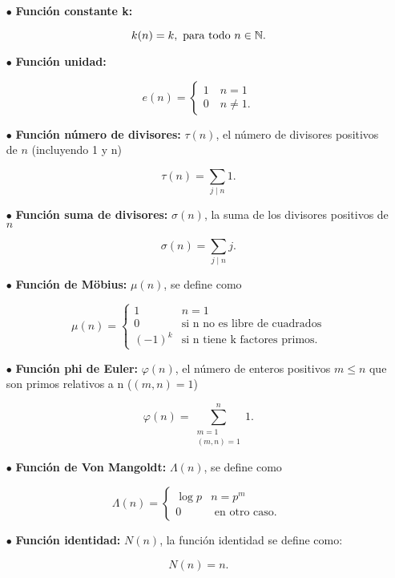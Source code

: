 \begin{itemize}
\item[$\bullet$] \textbf{Función constante k:}

$$k(n)=k, \text{ para todo } n \in \mathbb{N}. $$

\item[$\bullet$] \textbf{Función unidad:}

$$e(n)=\begin{cases}
1 \quad n=1\\
0 \quad n\neq 1.
\end{cases}$$

\item[$\bullet$] \textbf{Función número de divisores:} $\tau(n)$, el número de divisores positivos de $n$ (incluyendo 1 y n)

$$\tau(n)=\sum_{j\mid n}1.$$

\item[$\bullet$] \textbf{Función suma de divisores:} $\sigma(n)$, la suma de los divisores positivos de $n$

$$\sigma(n)=\sum_{j\mid n}j.$$

\item[$\bullet$] \textbf{Función de Möbius:} $\mu(n)$, se define como

$$\mu(n)=\begin{cases}
1  &n=1\\
0  &\text{si n no es libre de cuadrados}\\
(-1)^k &\text{si n tiene k factores primos.}
\end{cases}$$

\item[$\bullet$] \textbf{Función phi de Euler:} $\varphi(n)$, el número de enteros positivos $m\leq n$ que son primos relativos a n ($(m,n)=1$)

$$\varphi(n)=\sum_{\substack{m=1 \\(m, n)=1}}^n 1.$$

\item[$\bullet$]\textbf{Función de Von Mangoldt:} $\Lambda(n)$, se define como

$$\Lambda(n)= \begin{cases}\log p & n=p^m \\ 0 & \text { en otro caso. }\end{cases}$$

\item[$\bullet$]\textbf{Función identidad:} $N(n)$, la función identidad se define como:

$$N(n)=n.$$ 

\end{itemize}

